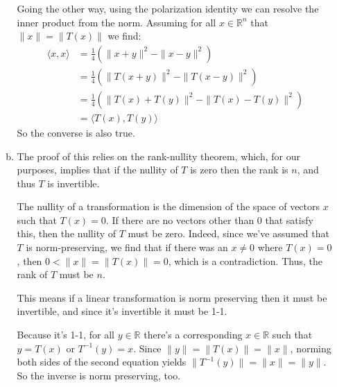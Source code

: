 \documentclass[letterpaper,10pt]{article}
\begin{document}
\begin{enumerate}
\begin{enumerate}[a)]
		Going the other way, using the polarization identity we can resolve the inner product from the norm. Assuming for all $x \in \mathbb{R}^n$ that $\|x\| = \|T(x)\|$ we find:
		\begin{align*}
		  \langle x, x \rangle & = \frac{1}{4} ( \|x+y\|^2 - \|x - y\|^2 ) \\
		  & = \frac{1}{4} ( \|T(x+y)\|^2 - \|T(x - y)\|^2 ) \\
		  & = \frac{1}{4} ( \|T(x)+T(y)\|^2 - \|T(x) - T(y)\|^2 ) \\
		  & = \langle T(x), T(y) \rangle 
		\end{align*}
		So the converse is also true.
		\item The proof of this relies on the rank-nullity theorem, which, for our purposes, implies that if the nullity of $T$ is zero then the rank is $n$, and thus $T$ is invertible.

		The nullity of a transformation is the dimension of the space of vectors $x$ such that $T(x) = 0$. If there are no vectors other than 0 that satisfy this, then the nullity of $T$ must be zero. Indeed, since we've assumed that $T$ is norm-preserving, we find that if there was an $x \neq 0$ where $T(x) = 0$, then $0 < \|x\| = \| T(x) \| = 0$, which is a contradiction. Thus, the rank of $T$ must be $n$.

		This means if a linear transformation is norm preserving then it must be invertible, and since it's invertible it must be 1-1.

		Because it's 1-1, for all $y \in \mathbb{R}$ there's a corresponding $x \in \mathbb{R}$ such that $y = T(x)$ or $T^{-1}(y) = x$. Since $\| y \| = \| T(x) \| = \| x \|$, norming both sides of the second equation yields $\| T^{-1}(y) \| = \| x \| = \| y \|$. So the inverse is norm preserving, too.
	\end{enumerate}
\end{enumerate}
\end{document}
